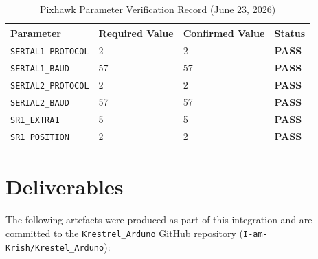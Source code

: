 \documentclass[11pt,a4paper]{article}
\begin{document}
\begin{table}[H]
    \centering
    \begin{tabular}{@{}llll@{}}
        \toprule
        \textbf{Parameter}    & \textbf{Required Value} &
        \textbf{Confirmed Value} & \textbf{Status} \\
        \midrule
        \texttt{SERIAL1\_PROTOCOL} & 2  & 2  &
            \textcolor{successgreen}{\textbf{PASS}} \\
        \texttt{SERIAL1\_BAUD}     & 57 & 57 &
            \textcolor{successgreen}{\textbf{PASS}} \\
        \texttt{SERIAL2\_PROTOCOL} & 2  & 2  &
            \textcolor{successgreen}{\textbf{PASS}} \\
        \texttt{SERIAL2\_BAUD}     & 57 & 57 &
            \textcolor{successgreen}{\textbf{PASS}} \\
        \texttt{SR1\_EXTRA1}       & 5  & 5  &
            \textcolor{successgreen}{\textbf{PASS}} \\
        \texttt{SR1\_POSITION}     & 2  & 2  &
            \textcolor{successgreen}{\textbf{PASS}} \\
        \bottomrule
    \end{tabular}
    \caption{Pixhawk Parameter Verification Record (June 23, 2026)}
\end{table}

\section{Deliverables}
\label{sec:deliverables}

The following artefacts were produced as part of this integration and are
committed to the \texttt{Krestrel\_Arduno} GitHub repository
(\texttt{I-am-Krish/Krestel\_Arduno}):
\end{document}
